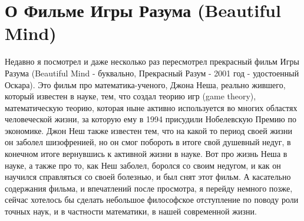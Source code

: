  
 
 
 
 

\section{О Фильме Игры Разума (Beautiful Mind)}

Недавно я посмотрел и даже несколько раз пересмотрел прекрасный фильм Игры
Разума (Beautiful Mind - буквально, Прекрасный Разум - 2001 год - удостоенный
Оскара).  Это фильм про математика-ученого, Джона Неша, реально жившего,
который известен в науке, тем, что создал теорию игр (game theory),
математическую теорию, которая ныне активно используется во многих областях
человеческой жизни, за которую ему в 1994 присудили Нобелевскую Премию по
экономике.  Джон Неш также известен тем, что на какой то период своей жизни он
заболел шизофренией, но он смог побороть в итоге свой душевный недуг, в
конечном итоге вернувшись к активной жизни в науке. Вот про жизнь Неша в науке,
а также про то, как Неш заболел, боролся со своим недугом, и как он научился
справляться со своей болезнью, и был снят этот фильм. А касательно содержания
фильма, и впечатлений после просмотра, я перейду немного позже, сейчас хотелось
бы сделать небольшое философское отступление по поводу роли точных наук, и в
частности математики, в нашей современной жизни.

